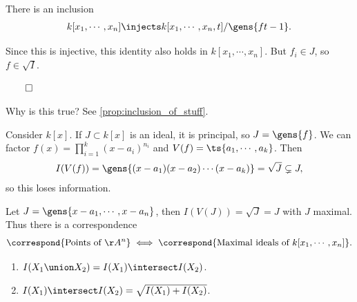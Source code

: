 \begin{proposition}\label{prop:inclusion_of_stuff}

There is an inclusion
\begin{align*}  
k[x_1, \cdots, x_n] \injects
k[x_1, \cdots, x_n, t]/\gens{ft-1}
.\end{align*}

\end{proposition}

Since this is injective, this identity also holds in
\(k[x_1, \cdots, x_n]\). But \(f_i\in J\), so \(f\in \sqrt{I}\).

\(\qed\)

\begin{exercise}[?]

Why is this true? See \cref{prop:inclusion_of_stuff}.

\end{exercise}

\begin{example}

Consider \(k[x]\). If \(J\subset k[x]\) is an ideal, it is principal, so
\(J = \gens{f}\). We can factor \(f(x) = \prod_{i=1}^k (x-a_i)^{n_i}\)
and \(V(f) = \ts{a_1, \cdots, a_k}\). Then
\begin{align*}
I(V(f)) = \gens{(x-a_1)(x-a_2)\cdots(x-a_k)} = \sqrt{J} \subsetneq J
,\end{align*} so this loses information.

\end{example}

\begin{example}

Let \(J = \gens{x-a_1, \cdots, x-a_n}\), then \(I(V(J)) = \sqrt{J} = J\)
with \(J\) maximal. Thus there is a correspondence
\begin{align*}  
\correspond{\text{Points of } \AA^n} \iff 
\correspond{\text{Maximal ideals of }k[x_1, \cdots, x_n]}
.\end{align*}

\end{example}

\begin{theorem}[Properties of $I$]

\envlist

\begin{enumerate}
\def\labelenumi{\alph{enumi}.}
\item
  \(I(X_1 \union X_2) = I(X_1) \intersect I(X_2)\).
\item
  \(I(X_1) \intersect I(X_2) = \sqrt{I(X_1) + I(X_2)}\).
\end{enumerate}

\end{theorem}

